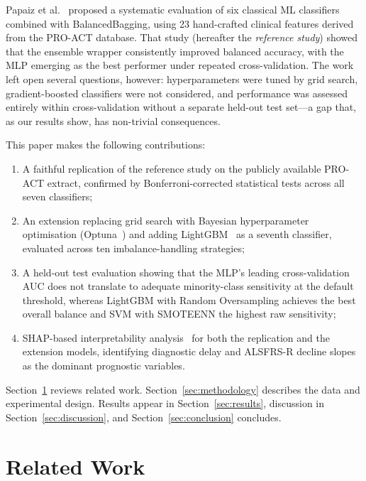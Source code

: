 \documentclass[a4paper,twoside]{article}
\begin{document}
Papaiz et al.~\cite{Papaiz2024} proposed a systematic evaluation of six
classical ML classifiers combined with BalancedBagging, using 23 hand-crafted
clinical features derived from the PRO-ACT database. That study (hereafter the \emph{reference study}) showed that the ensemble wrapper
consistently improved balanced accuracy, with the MLP emerging as the best
performer under repeated cross-validation. The work left open several questions,
however: hyperparameters were tuned by grid search, gradient-boosted classifiers
were not considered, and performance was assessed entirely within cross-validation
without a separate held-out test set---a gap that, as our results show, has
non-trivial consequences.

This paper makes the following contributions:
\begin{enumerate}
  \item A faithful replication of the reference study on the publicly available
    PRO-ACT extract, confirmed by Bonferroni-corrected statistical tests across
    all seven classifiers;
  \item An extension replacing grid search with Bayesian hyperparameter
    optimisation (Optuna~\cite{optuna2019}) and adding LightGBM~\cite{ke2017lightgbm}
    as a seventh classifier, evaluated across ten imbalance-handling strategies;
  \item A held-out test evaluation showing that the MLP's leading cross-validation
    AUC does not translate to adequate minority-class sensitivity at the default
    threshold, whereas LightGBM with Random Oversampling achieves the best overall
    balance and SVM with SMOTEENN the highest raw sensitivity;
  \item SHAP-based interpretability analysis~\cite{lundberg2017shap,lundberg2020treeshap} for both the replication and the extension models,
    identifying diagnostic delay and ALSFRS-R decline slopes as the dominant
    prognostic variables.
\end{enumerate}

Section~\ref{sec:related} reviews related work. Section~\ref{sec:methodology}
describes the data and experimental design. Results appear in
Section~\ref{sec:results}, discussion in Section~\ref{sec:discussion}, and
Section~\ref{sec:conclusion} concludes.


\section{Related Work}
\label{sec:related}
\end{document}
